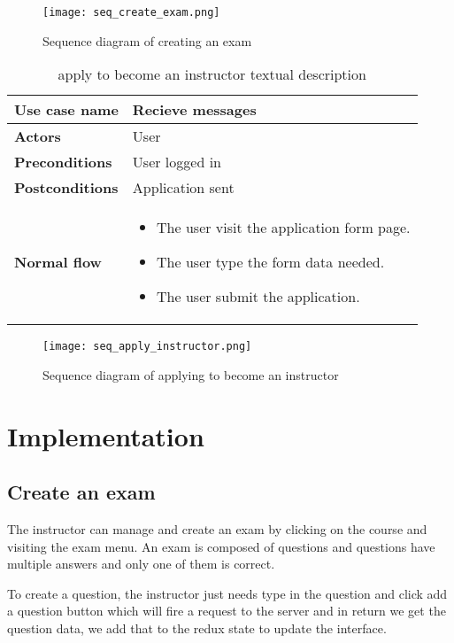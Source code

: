 \begin{figure}[!ht]
    \centering
    \texttt{[image: seq\_create\_exam.png]}
    \caption{Sequence diagram of creating an exam}
    \label{fig:seq_create_exam}
\end{figure}


\vfill
\clearpage

\begin{table}[H]
\centering
\caption{apply to become an instructor textual description}
\begin{tabular}{|p{4cm}|p{10cm}|}
\hline
\textbf{\large{Use case name}} & Recieve messages \\\hline
\textbf{\large{Actors}} & User \\\hline
\textbf{\large{Preconditions}} & User logged in \\\hline
\textbf{\large{Postconditions}} & Application sent \\\hline
\textbf{\large{Normal flow}} & 
\begin{itemize}
  \item The user visit the application form page.
  \item The user type the form data needed.
  \item The user submit the application.
\end{itemize}
\\\hline

\end{tabular}
\end{table}

\begin{figure}[!ht]
    \centering
    \texttt{[image: seq\_apply\_instructor.png]}
    \caption{Sequence diagram of applying to become an instructor}
    \label{fig:seq_apply_instructor}
\end{figure}



\section{Implementation}
\subsection{Create an exam}
The instructor can manage and create an exam by clicking on the course and visiting the exam menu. An exam is composed of questions and questions have multiple answers and only one of them is correct.

To create a question, the instructor just needs type in the question and click add a question button which will fire a request to the server and in return we get the question data, we add that to the redux state to update the interface.

